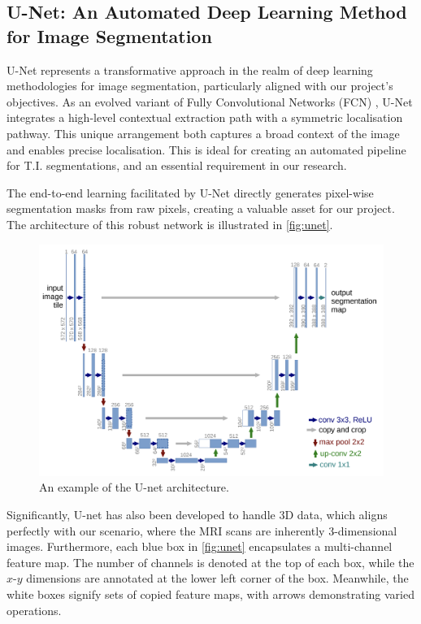 \subsection{U-Net: An Automated Deep Learning Method for Image Segmentation}

U-Net \cite{ronneberger2015u} represents a transformative approach in the realm of deep learning methodologies for image segmentation, particularly aligned with our project's objectives. As an evolved variant of Fully Convolutional Networks (FCN) \cite{long2015fully}, U-Net integrates a high-level contextual extraction path with a symmetric localisation pathway. This unique arrangement both captures a broad context of the image and enables precise localisation. This is ideal for creating an automated pipeline for T.I. segmentations, and an essential requirement in our research. 

The end-to-end learning facilitated by U-Net directly generates pixel-wise segmentation masks from raw pixels, creating a valuable asset for our project. The architecture of this robust network is illustrated in \autoref{fig:unet}.

\begin{figure}[htp]
    \centering
    \includegraphics[width=\textwidth]{./figures/unet.png}
    \caption{An example of the U-net architecture.}
    \label{fig:unet}
\end{figure}

Significantly, U-net has also been developed to handle 3D data, which aligns perfectly with our scenario, where the MRI scans are inherently 3-dimensional images. Furthermore, each blue box in \autoref{fig:unet} encapsulates a multi-channel feature map. The number of channels is denoted at the top of each box, while the \(x\)-\(y\) dimensions are annotated at the lower left corner of the box. Meanwhile, the white boxes signify sets of copied feature maps, with arrows demonstrating varied operations.

